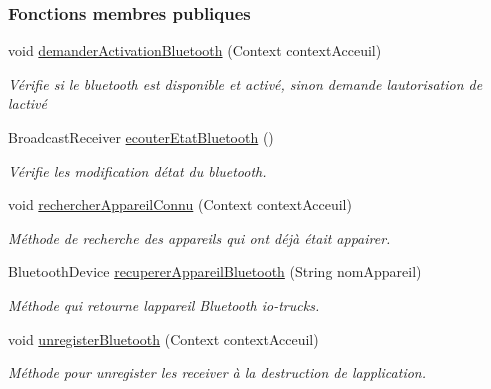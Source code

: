 \subsubsection*{Fonctions membres publiques}
\begin{DoxyCompactItemize}
\item 
void \hyperlink{classcom_1_1lasalle_1_1io__trucks_1_1_communication_aba4889871694f97fb1897f9a5b0979f4}{demander\+Activation\+Bluetooth} (Context context\+Acceuil)
\begin{DoxyCompactList}\small\item\em Vérifie si le bluetooth est disponible et activé, sinon demande l\textquotesingle{}autorisation de l\textquotesingle{}activé \end{DoxyCompactList}\item 
Broadcast\+Receiver \hyperlink{classcom_1_1lasalle_1_1io__trucks_1_1_communication_aee896ab782ae245bdb1177d3d80ba193}{ecouter\+Etat\+Bluetooth} ()
\begin{DoxyCompactList}\small\item\em Vérifie les modification d\textquotesingle{}état du bluetooth. \end{DoxyCompactList}\item 
void \hyperlink{classcom_1_1lasalle_1_1io__trucks_1_1_communication_a5e754807ead5e695279657bea324b5d7}{rechercher\+Appareil\+Connu} (Context context\+Acceuil)
\begin{DoxyCompactList}\small\item\em Méthode de recherche des appareils qui ont déjà était appairer. \end{DoxyCompactList}\item 
Bluetooth\+Device \hyperlink{classcom_1_1lasalle_1_1io__trucks_1_1_communication_a84ae8043b94d6f156a30f6f90dbbba4e}{recuperer\+Appareil\+Bluetooth} (String nom\+Appareil)
\begin{DoxyCompactList}\small\item\em Méthode qui retourne l\textquotesingle{}appareil Bluetooth io-\/trucks. \end{DoxyCompactList}\item 
void \hyperlink{classcom_1_1lasalle_1_1io__trucks_1_1_communication_ad5df5cc22c05d1a2af2b2c0adde57dea}{unregister\+Bluetooth} (Context context\+Acceuil)
\begin{DoxyCompactList}\small\item\em Méthode pour unregister les receiver à la destruction de l\textquotesingle{}application. \end{DoxyCompactList}\end{DoxyCompactItemize}
